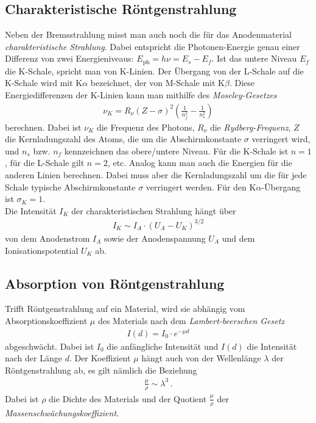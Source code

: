 \documentclass[12pt,a4paper,titlepage,headinclude,bibtotoc]{scrartcl}
\begin{document}
\subsection{Charakteristische Röntgenstrahlung}
Neben der Bremsstrahlung misst man auch noch die für das Anodenmaterial \emph{charakteristische Strahlung}.
Dabei entspricht die Photonen-Energie genau einer Differenz von zwei Energieniveaus: $E_\text{ph}=h\nu=E_s-E_f$.
Ist das untere Niveau $E_f$ die K-Schale, spricht man von K-Linien.
Der Übergang von der L-Schale auf die K-Schale wird mit K$\alpha$ bezeichnet, der von M-Schale mit K$\beta$.
Diese Energiedifferenzen der K-Linien kann man mithilfe des \emph{Moseley-Gesetzes}
\begin{align}
	\nu_K=R_\nu (Z-\sigma)^2\left(\frac{1}{n_f^2}-\frac{1}{n_s^2}\right)
	\label{eq:moseley}
\end{align}
berechnen.
Dabei ist $\nu_K$ die Frequenz des Photons, $R_\nu$ die \emph{Rydberg-Frequenz}, $Z$ die Kernladungszahl des Atoms, die um die Abschirmkonstante $\sigma$ verringert wird, und $n_s$ bzw. $n_f$ kennzeichnen das obere/untere Niveau.
Für die K-Schale ist $n=1$, für die L-Schale gilt $n=2$, etc.
Analog kann man auch die Energien für die anderen Linien berechnen.
Dabei muss aber die Kernladungszahl um die für jede Schale typische Abschirmkonstante $\sigma$ verringert werden.
Für den K$\alpha$-Übergang ist $\sigma_K=1$.\\

Die Intensität $I_K$ der charakteristischen Strahlung hängt über
\begin{align}
	I_K \sim I_A\cdot(U_A-U_K)^{3/2}
	\label{eq:IntChara}
\end{align}
von dem Anodenstrom $I_A$ sowie der Anodenspannung $U_A$ und dem Ionisationspotential $U_K$ ab.

\subsection{Absorption von Röntgenstrahlung}
Trifft Röntgenstrahlung auf ein Material, wird sie abhängig vom Absorptionskoeffizient $\mu$ des Materials nach dem \emph{Lambert-beerschen Gesetz}
\begin{align}
	I(d)=I_0\cdot e^{-\mu d}
	\label{eq:absorption}
\end{align}
abgeschwächt.
Dabei ist $I_0$ die anfängliche Intensität und $I(d)$ die Intensität nach der Länge $d$.
Der Koeffizient $\mu$ hängt auch von der Wellenlänge $\lambda$ der Röntgenstrahlung ab, es gilt nämlich die Beziehung 
\begin{align}
	\frac{\mu}{\rho}\sim\lambda^3\,.
	\label{eq:abs_koeff(lambda)}
\end{align}
Dabei ist $\rho$ die Dichte des Materials und der Quotient $\frac{\mu}{\rho}$ der \emph{Massenschwächungskoeffizient}.
\end{document}
